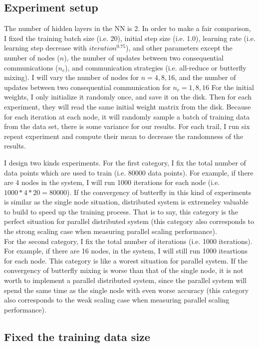 \documentclass{article}
\begin{document}
\subsection{Experiment setup}
The number of hidden layers in the NN is 2. In order to make a fair comparison, I fixed the training batch size (i.e. 20), initial step size (i.e. 1.0), learning rate (i.e. learning step decrease with $iteration^{0.75}$), and other parameters except the number of nodes ($n$), the number of updates between two consequential communications ($n_c$), and communication strategies (i.e. all-reduce or butterfly mixing). I will vary the number of nodes for $n = 4, 8, 16$, and the number of updates between two consequential communication for $n_c = 1, 8, 16$ For the initial weights, I only initialize it randomly once, and save it on the disk. Then for each experiment, they will read the same initial weight matrix from the disk. Because for each iteration at each node, it will randomly sample a batch of training data from the data set, there is some variance for our results. For each trail, I run six repeat experiment and compute their mean to decrease the randomness of the results. 

I design two kinds experiments. For the first category, I fix the total number of data points which are used to train (i.e. 80000 data points). For example, if there are 4 nodes in the system, I will run 1000 iterations for each node (i.e. $1000*4*20 = 80000$). If the convergency of butterfly in this kind of experiments is similar as the single node situation, distributed system is extremeley valuable to build to speed up the training process. That is to say, this category is the perfect situation for parallel distributed system (this category also corresponds to the strong scaling case when measuring parallel scaling performance).\\

For the second category, I fix the total number of iterations (i.e. 1000 iterations). For example, if there are 16 nodes, in the system, I will still run 1000 iteartions for each node. This category is like a worest situation for parallel system. If the convergency of butterfly mixing is worse than that of the single node, it is not worth to implement a parallel distributed system, since the parallel system will spend the same time as the single node with even worse accuracy (this category also corresponds to the weak scaling case when measuring parallel scaling performance).


\subsection{Fixed the training data size}
\end{document}
